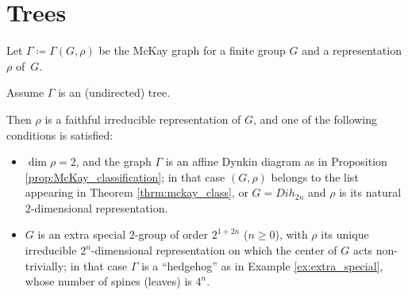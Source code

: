 \section{Trees}\label{sec:trees}
\begin{theorem}\label{thrm:main}
 Let $\Gamma \coloneqq  \Gamma(G, \rho)$ be the McKay graph for a finite group $G$ and a representation $\rho$ of~$G$. 
 
 Assume $\Gamma$ is an (undirected) tree. 
 
 Then $\rho$ is a faithful irreducible representation of $G$, and one of the following conditions is satisfied:
 \begin{itemize}
 \item $\dim \rho =2$, and the graph $\Gamma$ is an affine Dynkin diagram as in Proposition \ref{prop:McKay_classification}; in that case $(G, \rho)$ belongs to the list appearing in Theorem \ref{thrm:mckay_class}, or $G=Dih_{2n}$ and $\rho$ is its natural $2$-dimensional representation.
  \item $G$ is an extra special $2$-group of order  $2^{1+2n}$ ($n\geq 0$), with $\rho$ its unique irreducible $2^n$-dimensional representation on which the center of $G$ acts non-trivially; in that case $\Gamma$ is a ``hedgehog'' as in Example \ref{ex:extra_special}, whose number of spines (leaves) is $4^n$. 
 \end{itemize}

\end{theorem}


